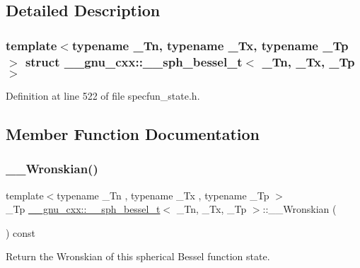 \subsection{Detailed Description}
\subsubsection*{template$<$typename \+\_\+\+Tn, typename \+\_\+\+Tx, typename \+\_\+\+Tp$>$\newline
struct \+\_\+\+\_\+gnu\+\_\+cxx\+::\+\_\+\+\_\+sph\+\_\+bessel\+\_\+t$<$ \+\_\+\+Tn, \+\_\+\+Tx, \+\_\+\+Tp $>$}



Definition at line 522 of file specfun\+\_\+state.\+h.



\subsection{Member Function Documentation}
\mbox{\label{struct____gnu__cxx_1_1____sph__bessel__t_aefdc67ff4bd4b74bf6337c2a5724849b}} 
\subsubsection{\texorpdfstring{\+\_\+\+\_\+\+Wronskian()}{\_\_Wronskian()}}
{\footnotesize\ttfamily template$<$typename \+\_\+\+Tn , typename \+\_\+\+Tx , typename \+\_\+\+Tp $>$ \\
\+\_\+\+Tp \hyperlink{struct____gnu__cxx_1_1____sph__bessel__t}{\+\_\+\+\_\+gnu\+\_\+cxx\+::\+\_\+\+\_\+sph\+\_\+bessel\+\_\+t}$<$ \+\_\+\+Tn, \+\_\+\+Tx, \+\_\+\+Tp $>$\+::\+\_\+\+\_\+\+Wronskian (\begin{DoxyParamCaption}{ }\end{DoxyParamCaption}) const\hspace{0.3cm}{\ttfamily [inline]}}



Return the Wronskian of this spherical Bessel function state. 



